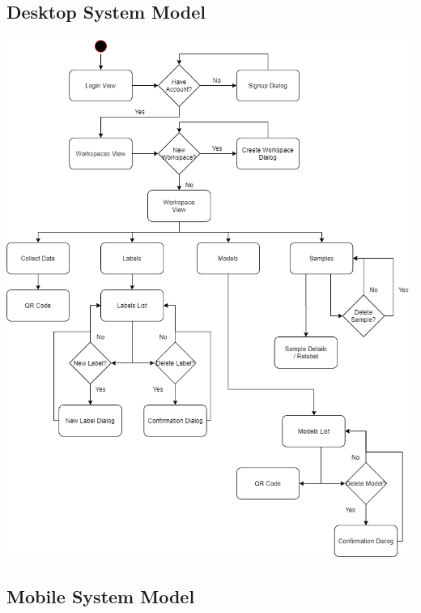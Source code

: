 \subsection{Desktop System Model}
\begin{center}
    \includegraphics[width=\textwidth,height=0.85\textheight,keepaspectratio]{charts/flow1.png}
\end{center}
\subsection{Mobile System Model}
